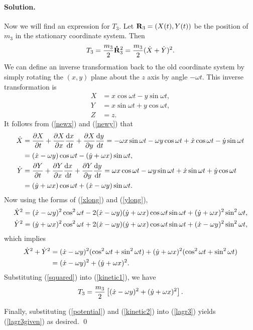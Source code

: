 \documentclass[11pt]{article}
\newcommand{\refeq}[1]{(\ref{#1})}
\newenvironment{solution}
{
    \paragraph{Solution.}
    \ignorespaces
}
{
    \bigskip
}
\begin{document}
\begin{solution}
	Now we will find an expression for $T_3$.  Let $\mathbf{R}_3 = (X(t), Y(t))$ be the position of $m_3$ in the stationary coordinate system.  Then
	\begin{equation} \label{kinetic1}
		T_3 = \frac{m_3}{2} \mathbf{\dot{R}}_3^2 = \frac{m_3}{2} (\dot{X} + \dot{Y})^2.
	\end{equation}
	We can define an inverse transformation back to the old coordinate system by simply rotating the $(x, y)$ plane about the $z$ axis by angle $-\omega t$.  This inverse transformation is
	\begin{align}
		X &= x \cos{\omega t} - y \sin{\omega t}, \label{newx} \\
		Y &= x \sin{\omega t} + y \cos{\omega t},  \label{newy} \\
		Z &= z.
	\end{align}
	It follows from \refeq{newx} and \refeq{newy} that
	\begin{align}
		\dot{X} &= \pdv{X}{t} + \pdv{X}{x} \dv{x}{t} + \pdv{X}{y} \dv{y}{t} = - \omega x \sin{\omega t} - \omega y \cos{\omega t} + \dot{x} \cos{\omega t} - \dot{y} \sin{\omega t} \label{xlong} \\
			&= (\dot{x} - \omega y) \cos{\omega t} - (\dot{y} + \omega x) \sin{\omega t}, \\
		\dot{Y} &= \pdv{Y}{t} + \pdv{Y}{x} \dv{x}{t} + \pdv{Y}{y} \dv{y}{t} =  \omega x \cos{\omega t} - \omega y \sin{\omega t} + \dot{x} \sin{\omega t} + \dot{y} \cos{\omega t} \label{ylong} \\
		&= (\dot{y} + \omega x) \cos{\omega t} + (\dot{x} - \omega y) \sin{\omega t}.
	\end{align}
	Now using the forms of \refeq{xlong} and \refeq{ylong},
	\begin{align}
		\dot{X}^2 &= (\dot{x} - \omega y)^2 \cos^2{\omega t} - 2 (\dot{x} - \omega y) (\dot{y} + \omega x) \cos{\omega t} \sin{\omega t} + (\dot{y} + \omega x)^2 \sin^2{\omega t}, \\
		\dot{Y}^2 &= (\dot{y} + \omega x)^2 \cos^2{\omega t} + 2 (\dot{x} - \omega y) (\dot{y} + \omega x) \cos{\omega t} \sin{\omega t} + (\dot{x} - \omega y)^2 \sin^2{\omega t},
	\end{align}
	which implies
	\begin{align}
		\dot{X}^2 + \dot{Y}^2 &= (\dot{x} - \omega y)^2 (\cos^2{\omega t} + \sin^2{\omega t}) + (\dot{y} + \omega x)^2 (\cos^2{\omega t} + \sin^2{\omega t}) \\
		&= (\dot{x} - \omega y)^2 + (\dot{y} + \omega x)^2. \label{squared}
	\end{align}
	Substituting \refeq{squared} into \refeq{kinetic1}, we have
	\begin{equation} \label{kinetic2}
		T_3 = \frac{m_3}{2} \left[ (\dot{x} - \omega y)^2 + (\dot{y} + \omega x)^2 \right].
	\end{equation}
	
	Finally, substituting \refeq{potential} and \refeq{kinetic2} into \refeq{lagr3} yields \refeq{lagr3given} as desired. \qed
\end{solution}
\end{document}
